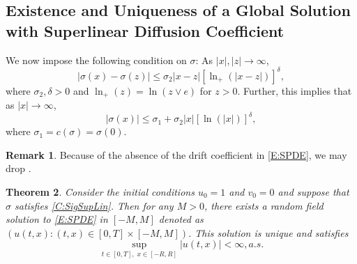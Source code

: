 \documentclass[a4paper,11pt]{article}
\numberwithin{equation}{section}
\theoremstyle{plain}
\newtheorem{theorem}{Theorem}[section]
\theoremstyle{definition}
\newtheorem{remark}[theorem]{Remark}
\numberwithin{NQ}{section}
\numberwithin{LQ}{section}
\numberwithin{ZQ}{section}
\begin{document}
\subsection{Existence and Uniqueness of a Global Solution with Superlinear Diffusion Coefficient}

We now impose the following condition on $\sigma$: As $|x|,|z| \to \infty$,
	\begin{equation}
	\label{C:SigSupLin}
		|\sigma(x)-\sigma(z)| \le \sigma_2|x-z|[\ln_+(|x-z|)]^{\delta},
	\end{equation}
where $\sigma_2 , \delta >0$ and $\ln_+(z) = \ln(z \vee e)$ for $z >0$. Further, this implies that as $|x| \to \infty$,
	\begin{equation}
		|\sigma(x)| \le \sigma_1 + \sigma_2|x|[\ln(|x|)]^{\delta},
	\end{equation}
where $\sigma_1 = c(\sigma) = \sigma(0)$.

	\begin{remark}
Because of the absence of the drift coefficient in \eqref{E:SPDE}, we may drop \cite[Assumption C1]{SoleMillet2021}.
	\end{remark}

\begin{theorem}
	Consider the initial conditions $u_0=1$ and $v_0=0$ and suppose that $\sigma$ satisfies \eqref{C:SigSupLin}. Then for any $M>0$, there exists a random field solution to \eqref{E:SPDE} in $[-M,M]$ denoted as $(u(t,x): (t,x) \in [0,T]\times[-M,M])$. This solution is unique and satisfies 
		\begin{equation}
			\sup_{t\in[0,T],\; x\in[-R,R]} |u(t,x)| < \infty, a.s.
		\end{equation}
\end{theorem}
\end{document}
